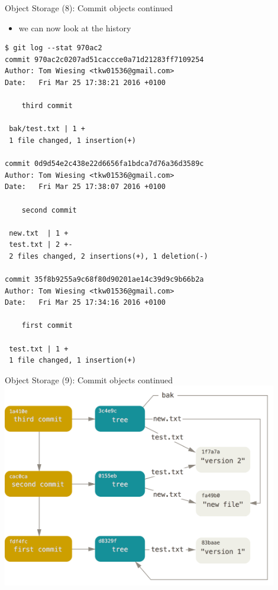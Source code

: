 \begin{frame}[fragile]{Object Storage (8): Commit objects continued}
  \begin{itemize}
    \item we can now look at the history
  \end{itemize}
\begin{lstlisting}[style=ShellCmd]
$ git log --stat 970ac2
commit 970ac2c0207ad51caccce0a71d21283ff7109254
Author: Tom Wiesing <tkw01536@gmail.com>
Date:   Fri Mar 25 17:38:21 2016 +0100

    third commit

 bak/test.txt | 1 +
 1 file changed, 1 insertion(+)

commit 0d9d54e2c438e22d6656fa1bdca7d76a36d3589c
Author: Tom Wiesing <tkw01536@gmail.com>
Date:   Fri Mar 25 17:38:07 2016 +0100

    second commit

 new.txt  | 1 +
 test.txt | 2 +-
 2 files changed, 2 insertions(+), 1 deletion(-)

commit 35f8b9255a9c68f80d90201ae14c39d9c9b66b2a
Author: Tom Wiesing <tkw01536@gmail.com>
Date:   Fri Mar 25 17:34:16 2016 +0100

    first commit

 test.txt | 1 +
 1 file changed, 1 insertion(+)
\end{lstlisting}
\end{frame}

\begin{frame}[fragile]{Object Storage (9): Commit objects continued}
  \includegraphics[width=0.90\textwidth]{imgs/commit_tree}
\end{frame}